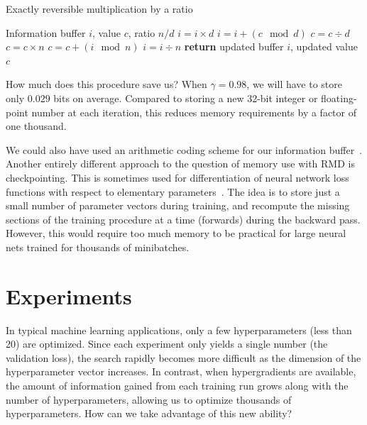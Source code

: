 \documentclass{article}
\newcommand{\primal}{elementary}
\newcommand{\decay}{\gamma}
\begin{document}
\begin{algorithm}
   \caption{Exactly reversible multiplication by a ratio}
   \label{alg:reversible-mult}
\begin{algorithmic}[1]
    Information buffer $i$, value $c$, ratio $n / d$
   \State $i = i \times d$                \label{step:f1}
   \State $i = i + (c \! \mod d)$    \label{step:f2}
   \State $c = c \div d$                    \label{step:f3}
   \State $c = c \times n$                  \label{step:b1}
   \State $c = c +  (i \! \mod n)$          \label{step:b2}
   \State $i = i \div n$               \label{step:b3}
   \State \textbf{return} updated buffer $i$, updated value $c$
\end{algorithmic}
\end{algorithm}

How much does this procedure save us? When $\decay =  0.98$, we will have
to store only $0.029$ bits on average. Compared to storing a new 32-bit integer or
floating-point number at each iteration, this reduces memory requirements by a factor of one thousand.

We could also have used an arithmetic coding scheme for our information
buffer~\citep{steinruecken2014a}. Another entirely different approach to the question
of memory use with RMD is checkpointing. This is sometimes used for
differentiation of neural network loss functions with respect to {\primal}
parameters~\citep{martens2012training}. The idea is to store just a small number
of parameter vectors during training, and recompute the missing sections of the training
procedure at a time (forwards) during the backward pass. However, this would
require too much memory to be practical for large neural nets trained for
thousands of minibatches.

\section{Experiments}
\label{sec:experiments}


In typical machine learning applications, only a few hyperparameters (less than 20) are optimized.
Since each experiment only yields a single number (the validation loss), the search rapidly becomes more difficult as the dimension of the hyperparameter vector increases.
In contrast, when hypergradients are available, the amount of information gained from each training run grows along with the number of hyperparameters, allowing us to optimize thousands of hyperparameters. %
How can we take advantage of this new ability?
\end{document}
